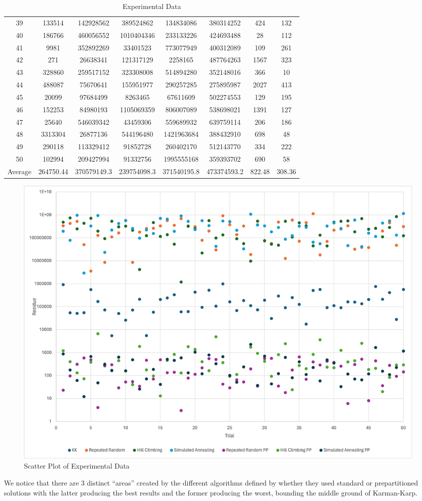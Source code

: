 \documentclass[11pt]{scrartcl}
\theoremstyle{dotlessP}
\theoremstyle{dotlessN}
\theoremstyle{dotN}
\begin{document}
\begin{table}[H]
{\begin{tabular}{c|c|c|c|c|c|c|c}
            39 & 133514 & 142928562 & 389524862 & 134834086 & 380314252 & 424 & 132 \\
            40 & 186766 & 460056552 & 1010404346 & 233133226 & 424693488 & 28 & 112 \\
            41 & 9981 & 352892269 & 33401523 & 773077949 & 400312089 & 109 & 261 \\
            42 & 271 & 26638341 & 121317129 & 2258165 & 487764263 & 1567 & 323 \\
            43 & 328860 & 259517152 & 323308008 & 514894280 & 352148016 & 366 & 10 \\
            44 & 488087 & 75670641 & 155951977 & 290257285 & 275895987 & 2027 & 413 \\
            45 & 20099 & 97684499 & 8263465 & 67611609 & 502274553 & 129 & 195 \\
            46 & 152253 & 84980193 & 1105069359 & 806007089 & 538698021 & 1391 & 127 \\
            47 & 25640 & 546039342 & 43459306 & 559689932 & 639759114 & 206 & 186 \\
            48 & 3313304 & 26877136 & 544196480 & 1421963684 & 388432910 & 698 & 48 \\
            49 & 290118 & 113329412 & 91852728 & 260402170 & 512143770 & 334 & 222 \\
            50 & 102994 & 209427994 & 91332756 & 1995555168 & 359393702 & 690 & 58 \\
            Average & 264750.44 & 370579149.3 & 239754098.3 & 371540195.8	& 473374593.2 &	822.48 &	308.36
    \end{tabular}}
    \caption{Experimental Data}
\end{table}
\begin{figure}[H]
    \centering
\includegraphics[width=\textwidth]{data.png}
\caption{Scatter Plot of Experimental Data}
\end{figure}
We notice that there are 3 distinct ``areas'' created by the different algorithms defined by whether they used
standard or prepartitioned solutions with the latter producing the best results and the former producing the
worst, bounding the middle ground of Karman-Karp. 
\end{document}
